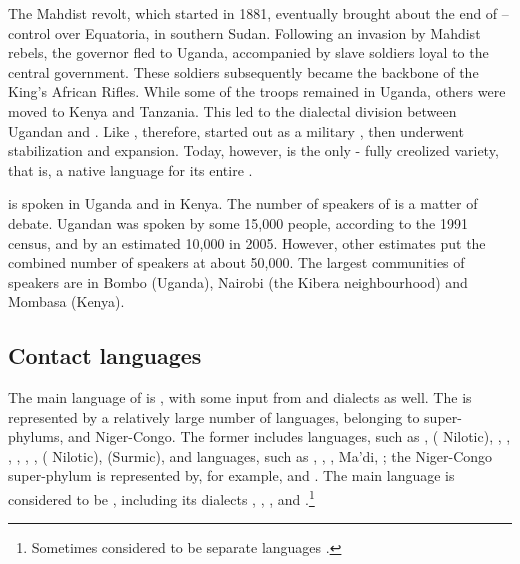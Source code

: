 \documentclass[output=paper]{langsci/langscibook}
\begin{document}
The Mahdist revolt, which started in 1881, eventually brought about the end of -- control over Equatoria, in southern Sudan. Following an invasion by Mahdist rebels, the governor fled to Uganda, accompanied by slave soldiers loyal to the central government. These soldiers subsequently became the backbone of the  King’s African Rifles. While some of the troops remained in Uganda, others were moved to Kenya and Tanzania. This led to the dialectal division between Ugandan and . Like  , therefore,  started out as a military , then underwent stabilization and expansion. Today, however,  is the only - fully creolized variety, that is, a native language for its entire .

 is spoken in Uganda and in Kenya. The number of speakers of  is a matter of debate. Ugandan  was spoken by some 15,000 people, according to the 1991 census, and  by an estimated 10,000 in 2005. However, other estimates put the combined number of speakers at about 50,000. The largest communities of  speakers are in Bombo (Uganda), Nairobi (the Kibera neighbourhood) and Mombasa (Kenya).


 
 \subsection{Contact languages}


The main  language of   is  , with some input from   and   dialects as well. The  is represented by a relatively large number of languages, belonging to super-phylums,  and Niger-Congo. The former includes   languages, such as ,  ( Nilotic), , , , , , ,  ( Nilotic),  (Surmic), and   languages, such as , , , Ma'di, ; the Niger-Congo super-phylum is represented by, for example,  and . The main  language is considered to be , including its dialects , , , and .\footnote{Sometimes considered to be separate languages \citep[207]{Wellens2003}.}
\end{document}
